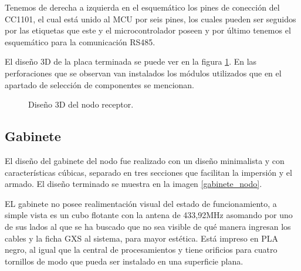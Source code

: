 Tenemos de derecha a izquierda en el esquemático los pines de conección del CC1101, el cual está unido al MCU por seis pines, los 
cuales pueden ser seguidos por las etiquetas que este y el microcontrolador poseen y por último tenemos el esquemático para 
la comunicación RS485. \par 

El diseño 3D de la placa terminada se puede ver en la figura \ref{3d_nodo}. En las perforaciones que se observan van 
instalados los módulos utilizados que en el apartado de selección de componentes se mencionan.


\begin{figure}[!h]
	\begin{center}
		\caption{Diseño 3D del nodo receptor.}
		\label{3d_nodo}
	\end{center}
\end{figure}


\subsection{Gabinete}

El diseño del gabinete del nodo fue realizado con un diseño minimalista y con características cúbicas, separado en tres secciones que facilitan
la impersión y el armado. El diseño terminado se muestra en la imagen \ref{gabinete_nodo}. \par 
EL gabinete no posee realimentación visual del estado 
de funcionamiento, a simple vista es un cubo flotante con la antena de 433,92MHz asomando por uno de sus lados al que se ha buscado que no 
sea visible de qué manera ingresan los cables y la ficha GXS al sistema, para mayor estética. Está impreso en PLA negro, al igual que la central de 
procesamientos y tiene orificios para cuatro tornillos de modo que pueda ser instalado en una superficie plana.  \par 

